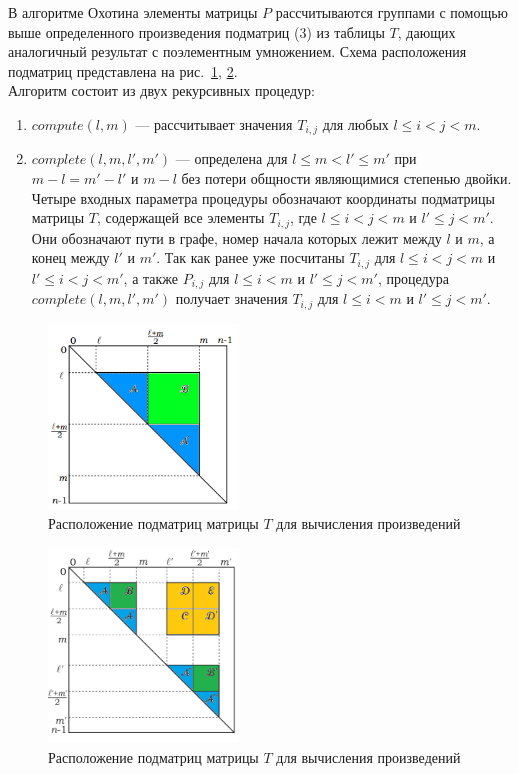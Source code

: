В алгоритме Охотина элементы матрицы $P$ рассчитываются
группами с помощью выше определенного произведения
подматриц (3) из таблицы $T$, дающих аналогичный результат с
поэлементным умножением. Схема расположения подматриц
представлена на рис.~\ref{submatrices1},  \ref{submatrices2}.
\\Алгоритм состоит из двух рекурсивных процедур:
\begin{enumerate}
\item $compute(l, m)$ --- рассчитывает значения $T_{i,j}$ для любых $l \le i < j < m$.
\item $complete(l, m, l', m')$ --- определена для $l \le m < l' \le m'$ при $m - l = m' - l'$ и $m - l$ без потери общности являющимися степенью двойки.
\\Четыре входных параметра процедуры обозначают координаты
подматрицы матрицы $T$, содержащей все элементы $T_{i,j}$, где $l \le i < j < m$ и $l' \le j < m'$. Они обозначают пути в графе, номер начала которых лежит между $l$ и $m$, а конец между $l'$ и $m'$. Так как ранее уже посчитаны $T_{i,j}$ для $l \le i < j < m$ и $l' \le i < j < m'$, а также $P_{i,j}$ для $l \le i < m$ и $l' \le j < m'$, процедура $complete(l, m, l', m')$ получает значения $T_{i,j}$ для $l \le i < m$ и $l' \le j < m'$.
\end{enumerate}
\begin{figure}
\centering
\includegraphics[width=0.45\textwidth]{Shemetova/subm1.png}
\caption{Расположение подматриц матрицы $T$ для вычисления произведений}
\label{submatrices1}
\end{figure}
\begin{figure}
\centering
\includegraphics[width=0.45\textwidth]{Shemetova/sub1.jpg}
\caption{Расположение подматриц матрицы $T$ для вычисления произведений}
\label{submatrices2}
\end{figure}

